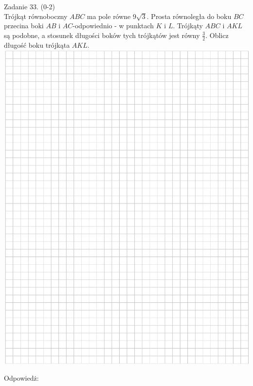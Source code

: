 \documentclass[10pt]{article}
\begin{document}
Zadanie 33. (0-2)\\
Trójkąt równoboczny \(A B C\) ma pole równe \(9 \sqrt{3}\). Prosta równoległa do boku \(B C\) przecina boki \(A B\) i \(A C\)-odpowiednio - w punktach \(K\) i \(L\). Trójkąty \(A B C\) i \(A K L\) są podobne, a stosunek długości boków tych trójkątów jest równy \(\frac{3}{2}\). Oblicz długość boku trójkąta \(A K L\).\\
\includegraphics[max width=\textwidth, center]{2024_11_21_46d945490f1b2eff1c8eg-20}

Odpowiedż: \(\qquad\)
\end{document}
